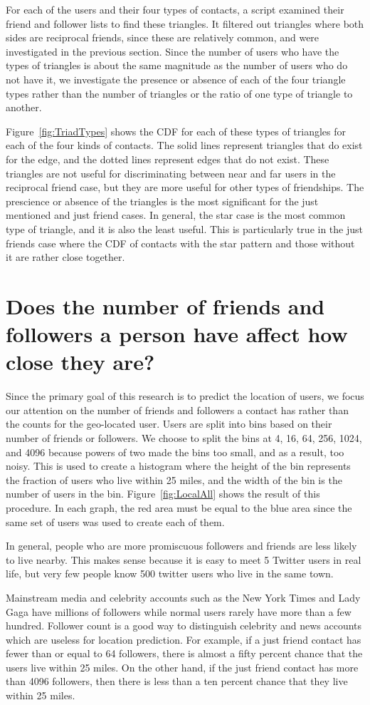 For each of the users and their four types of contacts, a script examined their
friend and follower lists to find these triangles.
It filtered out triangles where both sides are reciprocal friends, since these
are relatively common, and were investigated in the previous section.
Since the number of users who have the types of triangles is about the same
magnitude as the number of users who do not have it, we investigate the
presence or absence of each of the four triangle types rather than the number
of triangles or the ratio of one type of triangle to another.

Figure~\ref{fig:TriadTypes} shows the CDF for each of these types of triangles
for each of the four kinds of contacts.
The solid lines represent triangles that do exist for the edge, and the dotted
lines represent edges that do not exist.
These triangles are not useful for discriminating between near and far users in
the reciprocal friend case, but they are more useful for other types of
friendships.
The prescience or absence of the triangles is the most significant for the just
mentioned and just friend cases.
In general, the star case is the most common type of triangle, and it is also
the least useful.
This is particularly true in the just friends case where the CDF of contacts
with the star pattern and those without it are rather close together.

\section{Does the number of friends and followers a person have affect how
close they are?}

Since the primary goal of this research is to predict the location of users, we
focus our attention on the number of friends and followers a contact has rather
than the counts for the geo-located user. 
Users are split into bins based on their number of friends or followers.
We choose to split the bins at 4, 16, 64, 256, 1024, and 4096 because powers
of two made the bins too small, and as a result, too noisy.
This is used to create a histogram where the height of the bin represents the
fraction of users who live within 25 miles, and the width of the bin is the
number of users in the bin.
Figure~\ref{fig:LocalAll} shows the result of this procedure.
In each graph, the red area must be equal to the blue area since the same set
of users was used to create each of them.

In general, people who are more promiscuous followers and friends are less
likely to live nearby. This makes sense because it is easy to meet 5 Twitter
users in real life, but very few people know 500 twitter users who live in the
same town.

Mainstream media and celebrity accounts such as the New York Times and Lady
Gaga have millions of followers while normal users rarely have more than a few
hundred.
Follower count is a good way to distinguish celebrity and news accounts which
are useless for location prediction.
For example, if a just friend contact has fewer than or equal to 64 followers,
there is almost a fifty percent chance that the users live within 25 miles. On
the other hand, if the just friend contact has more than 4096 followers, then
there is less than a ten percent chance that they live within 25 miles.
